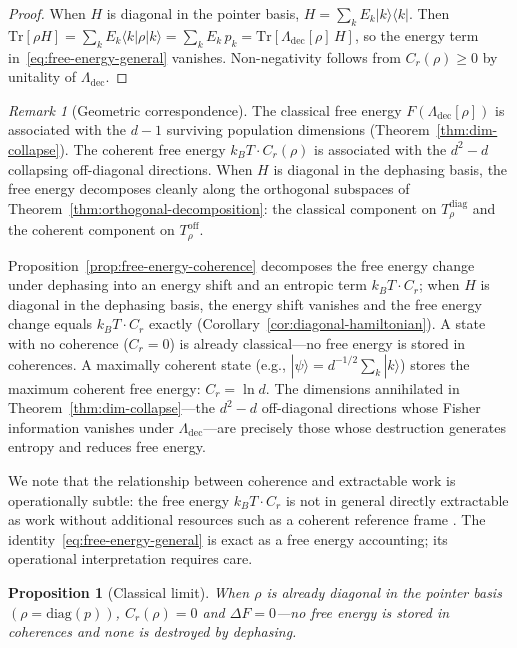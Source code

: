 \documentclass[12pt,a4paper]{article}
\newtheorem{proposition}[theorem]{Proposition}
\theoremstyle{definition}
\theoremstyle{remark}
\newtheorem{remark}[theorem]{Remark}
\begin{document}
\begin{proof}
When $H$ is diagonal in the pointer basis, $H = \sum_k E_k |k\rangle\langle k|$.  Then $\mathrm{Tr}[\rho H] = \sum_k E_k \langle k|\rho|k\rangle = \sum_k E_k\, p_k = \mathrm{Tr}[\Lambda_{\mathrm{dec}}[\rho]\, H]$, so the energy term in~\eqref{eq:free-energy-general} vanishes.  Non-negativity follows from $C_r(\rho) \geq 0$ by unitality of $\Lambda_{\mathrm{dec}}$.
\end{proof}

\begin{remark}[Geometric correspondence]
\label{rem:geometric-correspondence}
The classical free energy $F(\Lambda_{\mathrm{dec}}[\rho])$ is associated with the $d - 1$ surviving population dimensions (Theorem~\ref{thm:dim-collapse}).  The coherent free energy $k_B T \cdot C_r(\rho)$ is associated with the $d^2 - d$ collapsing off-diagonal directions.  When $H$ is diagonal in the dephasing basis, the free energy decomposes cleanly along the orthogonal subspaces of Theorem~\ref{thm:orthogonal-decomposition}: the classical component on $T_\rho^{\mathrm{diag}}$ and the coherent component on $T_\rho^{\mathrm{off}}$.
\end{remark}

Proposition~\ref{prop:free-energy-coherence} decomposes the free energy change under dephasing into an energy shift and an entropic term $k_B T \cdot C_r$; when $H$ is diagonal in the dephasing basis, the energy shift vanishes and the free energy change equals $k_B T \cdot C_r$ exactly (Corollary~\ref{cor:diagonal-hamiltonian}).  A state with no coherence ($C_r = 0$) is already classical---no free energy is stored in coherences.  A maximally coherent state (e.g., $|\psi\rangle = d^{-1/2} \sum_k |k\rangle$) stores the maximum coherent free energy: $C_r = \ln d$.  The dimensions annihilated in Theorem~\ref{thm:dim-collapse}---the $d^2 - d$ off-diagonal directions whose Fisher information vanishes under $\Lambda_{\mathrm{dec}}$---are precisely those whose destruction generates entropy and reduces free energy.

We note that the relationship between coherence and extractable work is operationally subtle: the free energy $k_B T \cdot C_r$ is not in general directly extractable as work without additional resources such as a coherent reference frame \cite{lostaglio2015description,korzekwa2016extraction}.  The identity~\eqref{eq:free-energy-general} is exact as a free energy accounting; its operational interpretation requires care.

\begin{proposition}[Classical limit]
\label{prop:classical-limit}
When $\rho$ is already diagonal in the pointer basis $(\rho = \mathrm{diag}(p))$, $C_r(\rho) = 0$ and $\Delta F = 0$---no free energy is stored in coherences and none is destroyed by dephasing.
\end{proposition}
\end{document}
